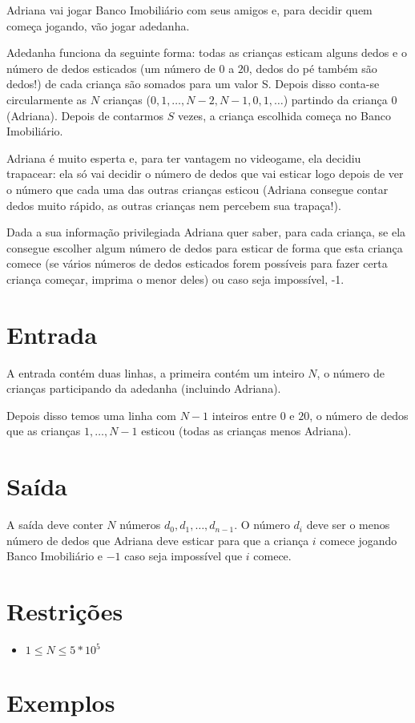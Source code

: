 Adriana vai jogar Banco Imobiliário com seus amigos e, para decidir quem começa jogando, vão jogar adedanha.

Adedanha funciona da seguinte forma: todas as crianças esticam alguns dedos e o número de dedos esticados (um número de $0$ a $20$, dedos do pé também são dedos!) de cada criança são somados para um valor S. Depois disso conta-se circularmente as $N$ crianças ($0, 1, \ldots, N - 2, N - 1, 0, 1, \ldots$) partindo da criança $0$ (Adriana). Depois de contarmos $S$ vezes, a criança escolhida começa no Banco Imobiliário.

Adriana é muito esperta e, para ter vantagem no videogame, ela decidiu trapacear: ela só vai decidir o número de dedos que vai esticar logo depois de ver o número que cada uma das outras crianças esticou (Adriana consegue contar dedos muito rápido, as outras crianças nem percebem sua trapaça!).

Dada a sua informação privilegiada Adriana quer saber, para cada criança, se ela consegue escolher algum número de dedos para esticar de forma que esta criança comece (se vários números de dedos esticados forem possíveis para fazer certa criança começar, imprima o menor deles) ou caso seja impossível, -1.

\section*{Entrada}

A entrada contém duas linhas, a primeira contém um inteiro $N$, o número de crianças participando da adedanha (incluindo Adriana).

Depois disso temos uma linha com $N - 1$ inteiros entre $0$ e $20$, o número de dedos que as crianças $1,\ldots,N - 1$ esticou (todas as crianças menos Adriana). 
\section*{Saída}

A saída deve conter $N$ números $d_0, d_1, \ldots, d_{n - 1}$. O número $d_i$ deve ser o menos número de dedos que Adriana deve esticar para que a criança $i$ comece jogando Banco Imobiliário e $-1$ caso seja impossível que $i$ comece.

\section*{Restrições}

\begin{itemize}
\item $1 \leq N \leq 5*10^5$
\end{itemize}

\section*{Exemplos}

\exemplo
